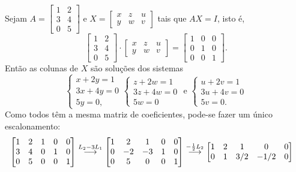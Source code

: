 \documentclass[12pt,a4paper]{article}
\newcommand{\grstep}[2][\relax]{%
   \ensuremath{\mathrel{
       {\mathop{\longrightarrow}\limits^{#2\mathstrut}_{
                                     \begin{subarray}{l} #1 \end{subarray}}}}}}
\begin{document}
\begin{ExerciseList}
\Answer Sejam $A = \begin{bmatrix}
1 & 2\\
3 & 4\\
0 & 5
\end{bmatrix}$ e $X = \begin{bmatrix}
x & z & u\\
y & w & v
\end{bmatrix}$ tais que $AX = I$, isto é,
\[
\begin{bmatrix}
1 & 2\\
3 & 4\\
0 & 5
\end{bmatrix}
\cdot
\begin{bmatrix}
x & z & u\\
y & w & v
\end{bmatrix}
=\begin{bmatrix}
1 & 0 & 0 \\
0 & 1 & 0 \\
0 & 0 & 1
\end{bmatrix}.
\]
Então as colunas de $X$ são soluções dos sistemas
\[
\begin{cases}
x+2y = 1\\
3x+4y = 0\\
5y = 0,
\end{cases}
\begin{cases}
z+2w = 1\\
3z+4w = 0\\
5w = 0
\end{cases}
\text{ e }
\begin{cases}
u+2v = 1\\
3u+4v = 0\\
5v = 0.
\end{cases}
\]
Como todos têm a mesma matriz de coeficientes, pode-se fazer um único escalonamento:
\begin{align*}
\begin{bmatrix}
1 & 2 & 1 & 0 & 0 \\
3 & 4 & 0 & 1 & 0 \\
0 & 5 & 0 & 0 & 1
\end{bmatrix}
& \grstep{ L_2 - 3 L_1 }
\begin{bmatrix}
1 & 2 & 1 & 0 & 0 \\
0 & -2 & -3 & 1 & 0 \\
0 & 5 & 0 & 0 & 1
\end{bmatrix}
\grstep{ -\frac{1}{2} L_2 }
\begin{bmatrix}
1 & 2 & 1 & 0 & 0 \\
0 & 1 & 3/2 & -1/2 & 0 \\

\end{bmatrix}
\end{align*}
\end{ExerciseList}
\end{document}
